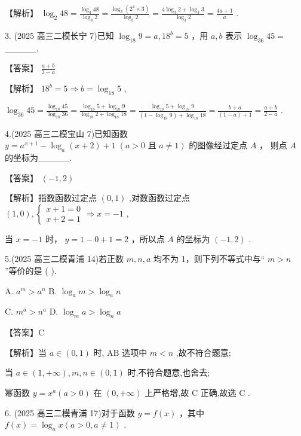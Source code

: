 \documentclass[10pt]{article}
\begin{document}
【解析】 \({\log }_{2}{48} = \frac{{\log }_{3}{48}}{{\log }_{3}2} = \frac{{\log }_{3}\left( {{2}^{4} \times  3}\right) }{{\log }_{3}2} = \frac{4{\log }_{3}2 + {\log }_{3}3}{{\log }_{3}2} = \frac{{4a} + 1}{a}\) .

3. (2025 高三二模长宁 7)已知 \({\log }_{18}9 = a,{18}^{b} = 5\) ，用 \(a,b\) 表示 \({\log }_{36}{45} =\) \_\_\_\_\_.

【答案】 \(\frac{a + b}{2 - a}\)

【解析】 \({18}^{b} = 5 \Rightarrow  b = {\log }_{18}5\) ,

\({\log }_{36}{45} = \frac{{\log }_{18}{45}}{{\log }_{18}{36}} = \frac{{\log }_{18}5 + {\log }_{18}9}{{\log }_{18}2 + {\log }_{18}{18}} = \frac{{\log }_{18}5 + {\log }_{18}9}{\left( {1 - {\log }_{18}9}\right)  + {\log }_{18}{18}} = \frac{b + a}{\left( {1 - a}\right)  + 1} = \frac{a + b}{2 - a}\) .

4.(2025 高三二模宝山 7)已知函数 \(y = {a}^{x + 1} - {\log }_{a}\left( {x + 2}\right)  + 1\;\left( {a > 0\text{ 且 }a \neq  1}\right)\) 的图像经过定点 \(A\) ， 则点 \(A\) 的坐标为\_\_\_\_\_.

【答案】 \(\left( {-1,2}\right)\)

【解析】指数函数过定点 \(\left( {0,1}\right)\) ,对数函数过定点 \(\left( {1,0}\right) ,\left\{  {\begin{array}{l} x + 1 = 0 \\  x + 2 = 1 \end{array} \Rightarrow  x =  - 1}\right.\) ,

当 \(x =  - 1\) 时， \(y = 1 - 0 + 1 = 2\) ，所以点 \(A\) 的坐标为 \(\left( {-1,2}\right)\) .

5.(2025 高三二模青浦 14)若正数 \(m,n,a\) 均不为 1，则下列不等式中与“ \(m > n\) ”等价的是 ( ).

A. \({a}^{m} > {a}^{n}\) B. \({\log }_{a}m > {\log }_{a}n\)

C. \({m}^{a} > {n}^{a}\) D. \({\log }_{m}a > {\log }_{n}a\)

【答案】C

【解析】当 \(a \in  \left( {0,1}\right)\) 时, \(\mathrm{{AB}}\) 选项中 \(m < n\) ,故不符合题意;

当 \(a \in  \left( {1, + \infty }\right) ,m,n \in  \left( {0,1}\right)\) 时,不符合题意,也舍去;

幂函数 \(y = {x}^{a}\left( {a > 0}\right)\) 在 \(\left( {0, + \infty }\right)\) 上严格增,故 \(\mathrm{C}\) 正确,故选 \(\mathrm{C}\) .

6. (2025 高三二模青浦 17)对于函数 \(y = f\left( x\right)\) ，其中 \(f\left( x\right)  = {\log }_{a}x\left( {a > 0,a \neq  1}\right)\) .
\end{document}

